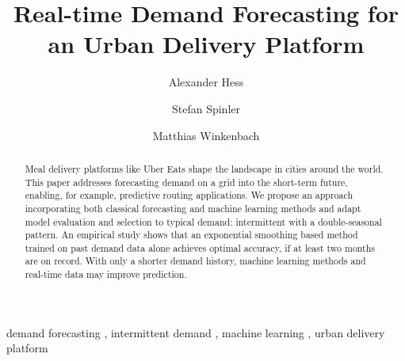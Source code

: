 \begin{frontmatter}

\title{Real-time Demand Forecasting for an Urban Delivery Platform}

\author[WHU]{Alexander Hess}
\author[WHU]{Stefan Spinler}
\author[MIT]{Matthias Winkenbach}
\address[WHU]{
WHU - Otto Beisheim School of Management,
Burgplatz 2, 56179 Vallendar, Germany
}
\address[MIT]{
Massachusetts Institute of Technology,
77 Massachusetts Avenue, Cambridge, MA 02139, United States
}

\begin{abstract}
Meal delivery platforms like Uber Eats shape the landscape in cities around the world.
This paper addresses forecasting demand on a grid into the short-term future,
    enabling, for example, predictive routing applications.
We propose an approach incorporating
    both classical forecasting and machine learning methods
    and adapt model evaluation and selection to typical demand:
        intermittent with a double-seasonal pattern.
An empirical study shows that
    an exponential smoothing based method trained on past demand data alone
        achieves optimal accuracy,
    if at least two months are on record.
With only a shorter demand history,
    machine learning methods and real-time data may improve prediction.
\end{abstract}

\begin{keyword}
demand forecasting \sep
intermittent demand \sep
machine learning \sep
urban delivery platform
\end{keyword}

\end{frontmatter}